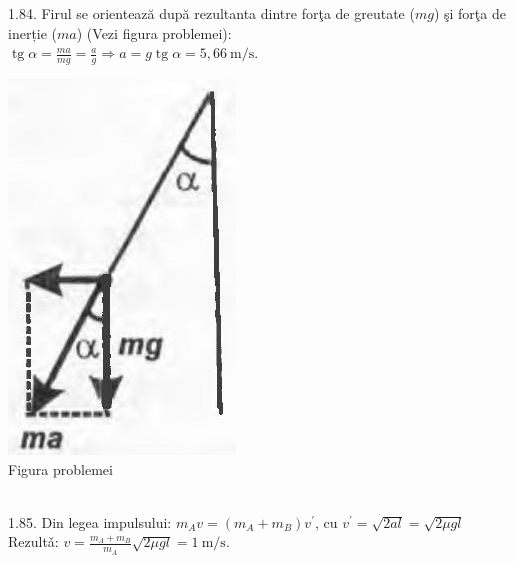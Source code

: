 1.84. Firul se orientează după rezultanta dintre forţa de greutate ($m g$) şi forţa de inerție ($m a$) (Vezi figura problemei):\\ $\operatorname{tg} \alpha=\frac{m a}{m g}=\frac{a}{g} \Rightarrow a=g \operatorname{tg} \alpha=5,66 \mathrm{~m} / \mathrm{s}$.\\ \begin{center} \includegraphics[width=0.4\linewidth]{images/2025_07_01_5b3ff9fa0d508c8e9f17g-213(1)}\\ Figura problemei \end{center}\\

1.85. Din legea impulsului: $m_{A} v=\left(m_{A}+m_{B}\right) v^{\prime}$, cu $v^{\prime}=\sqrt{2 a l}=\sqrt{2 \mu g l}$\\ Rezultǎ: $v=\frac{m_{A}+m_{B}}{m_{A}} \sqrt{2 \mu g l}=1 \mathrm{~m} / \mathrm{s}$.\\

